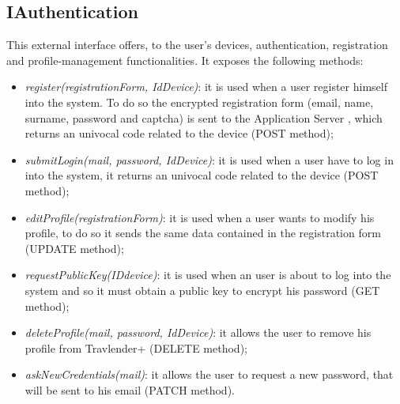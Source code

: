 \subsection{IAuthentication}
\label{subsect:IAuthentication}
This external interface offers, to the user's devices, authentication, registration and profile-management functionalities. It exposes the following methods:
\begin{itemize}
	\item \textit{register(registrationForm, IdDevice)}: it is used when a user register himself into the system. To do so the encrypted registration form (email, name, surname, password and captcha) is sent to the Application Server , which returns an univocal code related to the device (POST method);
	\item \textit{submitLogin(mail, password, IdDevice)}: it is used when a user have to log in into the system, it returns an univocal code related to the device (POST method);
	\item \textit{editProfile(registrationForm)}: it is used when a user wants to modify his profile, to do so it sends the same data contained in the registration form (UPDATE method);
	\item \textit{requestPublicKey(IDdevice)}: it is used when an user is about to log into the system and so it must obtain a public key to encrypt his password (GET method);
	\item \textit{deleteProfile(mail, password, IdDevice)}: it allows the user to remove his profile from Travlender+ (DELETE method);
	\item \textit{askNewCredentials(mail)}: it allows the user to request a new password, that will be sent to his email (PATCH method).
\end{itemize}


